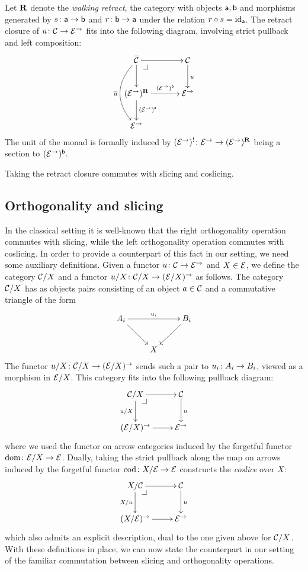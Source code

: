 \documentclass[reqno,10pt,a4paper,oneside]{amsart}
\begin{document}
\begin{remark} Let $\ret$ denote the \emph{walking retract}, \ie the category with objects $\retA, \retB$ and morphisms generated by $s \co \retA \to \retB$ and $r \co \retB \to \retA$ under the relation $r \cc s = \id_{\retA}$. The retract closure of $u \co \cal{C} \to \catE^\to$ fits into the following diagram, involving strict pullback and left composition:
\[
\xymatrix@C+1em{
  \overline{\cal{C}}
  \ar[r]
  \ar[d]
  \ar@/_2em/[dd]_{\overline{u}}
  \pullback{dr}
&
  \cal{C}
  \ar[d]^{u}
\\
  (\catE^{\to})^{\ret}
  \ar[r]^-{(\catE^{\to})^{\retB}}
  \ar[d]^{(\catE^{\to})^{\retA}}
&
  \catE^{\to}
\\
  \catE^{\to}
}
\]
The unit of the monad is formally induced by $(\catE^{\to})^{\canonical} \co \catE^{\to} \to (\catE^{\to})^{\ret}$ being a section to $(\catE^{\to})^{\retB}$.
\end{remark}


\begin{remark}
\label{retract-closure-slicing}
Taking the retract closure commutes with slicing and coslicing.
\end{remark}





\subsection*{Orthogonality and slicing} In the classical setting it is well-known that the right orthogonality operation commutes with slicing, while the left orthogonality operation commutes with coslicing.  In order to provide a counterpart of this fact in our setting, we need some auxiliary definitions. Given a functor $u \co \cal{C} \to \catE^{\to}$ and $X \in \catE$, we define the category $\cal{C}/X$
and a functor $u/X \co \cal{C}/X \to (\cal{E}/X)^\to$ as follows. The category $\cal{C}/X$ has as objects pairs consisting of an object $a \in \cal{C}$ and a commutative triangle of the form
\[
\xymatrix{
A_i \ar[dr] \ar[rr]^{u_i} & & B_i \ar[dl] \\
 & X }
 \]
The functor $u/X \co \cal{C}/X \to (\cal{E}/X)^\to$ sends such a pair to $u_i \co A_i \to B_i$, viewed as a morphism in $\cal{E}/X$. This category fits into the
following pullback diagram:
\[
\xymatrix{
  \cal{C}/X
  \ar[r]
  \ar[d]_{u/X}
  \pullback{dr}
&
  \cal{C}
  \ar[d]^{u}
\\
  (\catE/X)^{\to}
  \ar[r]
&
  \catE^{\to}
}
\]
where we used the functor on arrow categories induced by the forgetful functor $\operatorname{dom} \co \catE/X \to \catE$.  Dually, taking the strict pullback along the map on arrows induced by the forgetful functor 
$\operatorname{cod} \co X/\cal{E} \to \catE$ constructs the \emph{coslice} over $X$:
\[
\xymatrix{
  X/\cal{C}
  \ar[r]
  \ar[d]_{X/u}
  \pullback{dr}
&
  \cal{C}
  \ar[d]^{u}
\\
  (X/\catE)^{\to}
  \ar[r]
&
  \catE^{\to}
}
\]
which also admits an explicit description, dual to the one given above for $\cal{C}/X$. With these definitions in place, we can now state the counterpart in our setting of the familiar commutation between slicing and orthogonality operations. 
\end{document}
